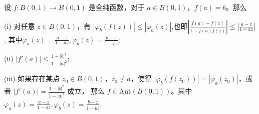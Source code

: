 \documentclass[../../main.tex]{subfiles}%
\begin{document}
\begin{theorem}\label{theorem:Schwarz-Pick定理-定理4.5.6}
设 \( f: B(0,1) \to B(0,1) \) 是全纯函数，对于 \( a \in B(0,1) \)，\( f(a) = b \)。那么

(i) 对任意 \( z \in B(0,1) \)，有 \( |\varphi_b(f(z))| \leqslant  |\varphi_a(z)| \),也即$\left|\frac{f(a) - f(z)}{1 - \overline{f(a)}f(z)}\right| \leqslant \left|\frac{a - z}{1 - \overline{a} z}\right|$,
其中$\varphi_a(z) = \frac{a - z}{1 - \overline{a} z},\varphi_b(z) = \frac{b - z}{1 - \overline{b} z}$;

(ii) \( |f'(a)| \leqslant  \frac{1 - |b|^2}{1 - |a|^2} \);

(iii) 如果存在某点 \( z_0 \in B(0,1) \)，\( z_0 \neq a \)，使得 \( |\varphi_b(f(z_0))| = |\varphi_a(z_0)| \)，或者 \( |f'(a)| = \frac{1 - |b|^2}{1 - |a|^2} \) 成立，
那么 \( f \in \text{Aut}(B(0,1)) \)。其中$\varphi_a(z) = \frac{a - z}{1 - \overline{a} z},\varphi_b(z) = \frac{b - z}{1 - \overline{b} z}.$
\end{theorem}
\end{document}
